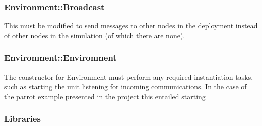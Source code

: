 \subsubsection{Environment::Broadcast}
This must be modified to send messages to other nodes in the deployment instead of other nodes in the simulation (of which there are none).

\subsubsection{Environment::Environment}
The constructor for Environment must perform any required instantiation tasks, such as starting the unit listening for incoming communications. In the case of the parrot example presented in the project this entailed starting 



\subsubsection{Libraries}
